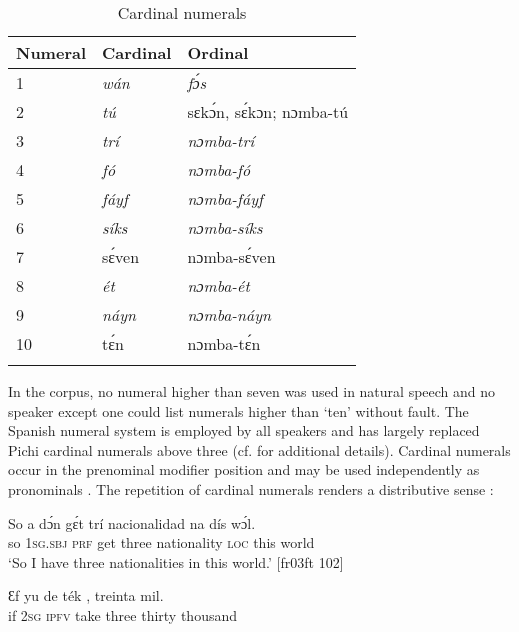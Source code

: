 \begin{table}
\caption{Cardinal numerals}
\label{tab:key:5.4}
\begin{tabularx}{.8\textwidth}{lXX}
\lsptoprule
 Numeral & Cardinal & Ordinal\\
 \midrule 
 1 & \textit{wán} & \textit{fɔ́s}\\
 2 & \textit{tú} & sɛkɔ́n, sɛ́kɔn; nɔmba-tú\\
 3 & \textit{trí} & \textit{nɔmba-trí}\\
 4 & \textit{fó} & \textit{nɔmba-fó}\\
 5 & \textit{fáyf} & \textit{nɔmba-fáyf}\\
 6 & \textit{síks} & \textit{nɔmba-síks}\\
 7 & sɛ́ven & nɔmba-sɛ́ven\\
 8 & \textit{ét} & \textit{nɔmba-ét}\\
 9 & \textit{náyn} & \textit{nɔmba-náyn}\\
 10 & tɛ́n & nɔmba-tɛ́n\\
\lspbottomrule
\end{tabularx}
\end{table}
In the corpus, no numeral higher than seven was used in natural speech and no speaker except one could list numerals higher than ‘ten’ without fault. The Spanish numeral system is employed by all speakers and has largely replaced Pichi cardinal numerals above three (cf.  for additional details). Cardinal numerals occur in the prenominal modifier position  and may be used independently as pronominals . The repetition of cardinal numerals renders a distributive sense : 


\ea%
    \label{ex:key:250}
    \gll So  a    dɔ́n  gɛ́t  trí    nacionalidad    na  dís  wɔ́l.\\
so  \textsc{1sg.sbj}  \textsc{prf}  get  three  nationality    \textsc{loc}  this  world\\

\glt ‘So I have three nationalities in this world.’ [fr03ft 102]
\z


\ea%
    \label{ex:key:251}
    \gll Ɛf  yu  de  ték  ,    treinta  mil.\\
if  \textsc{2sg}  \textsc{ipfv}  take  three  thirty  thousand\\

